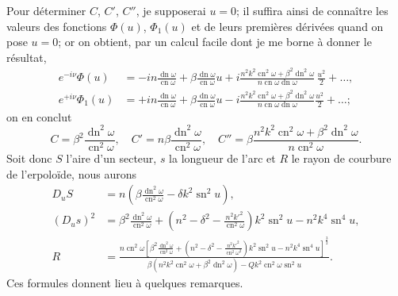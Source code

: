 \documentclass[11pt,leqno,oneside,letterpaper]{book}[2005/09/16]
\DeclareMathOperator{\sn}{sn}
\DeclareMathOperator{\cn}{cn}
\DeclareMathOperator{\dn}{dn}
\begin{document}
Pour d\'eterminer $C$, $C'$, $C''$, je supposerai $u = 0$; il suffira ainsi de conna\^itre
les valeurs des fonctions $\Phi(u)$, $\Phi_1(u)$ et de leurs premi\`eres d\'eriv\'ees
quand on pose $u = 0$; or on obtient, par un calcul facile dont je me
borne \`a donner le r\'esultat,
\begin{align*}
e^{-i\nu}\Phi(u)
&= -in  \frac{\dn\omega}{\cn\omega}
 + \beta\frac{\dn\omega}{\cn\omega}u
 + i\frac{ n^2k^2\cn^2\omega + \beta^2\dn^2\omega }{ n\cn\omega\dn\omega }\,
   \frac{u^2}{2} + \ldots,
\\
e^{+i\nu}\Phi_1(u)
&= +in  \frac{\dn\omega}{\cn\omega}
 + \beta\frac{\dn\omega}{\cn\omega}u
 - i\frac{ n^2k^2\cn^2\omega + \beta^2\dn^2\omega }{ n\cn\omega\dn\omega }
   \frac{u^2}{2} + \ldots;
\end{align*}
on en conclut
\[
C   =  \beta^2\frac{\dn^2\omega}{\cn^2\omega},\quad
C'  = n\beta  \frac{\dn^2\omega}{\cn^2\omega},\quad
C'' =  \beta\frac{n^2k^2\cn^2\omega+\beta^2\dn^2\omega}{n\cn^2\omega}.
\]
Soit donc $S$ l'aire d'un secteur, $s$ la longueur de l'arc et $R$ le rayon de courbure
de l'erpolo\"ide, nous aurons
\begin{align*}
   D_uS
&= n\left( \beta\frac{\dn^2\omega}{\cn^2\omega}
         - \delta k^2\sn^2u \right),
\\
   (D_us)^2
&= \beta^2\frac{\dn^2\omega}{\cn^2\omega}
 + \left(n^2 - \delta^2 - \frac{n^2k'^2}{\cn^2\omega}\right) k^2\sn^2u
 - n^2k^4\sn^4u,
\\
R &= \frac{ n\cn^2\omega
  \left[ \beta^2\frac{\dn^2\omega}{\cn^2\omega}
   + \left(n^2-\delta^2-\frac{n^2k'^2}{\cn^2\omega^2}\right) k^2\sn^2u
   - n^2k^4\sn^4u \right]^{\frac{3}{2}} }
         { \beta(n^2k^2\cn^2\omega+\beta^2\dn^2\omega)
         - Qk^2\cn^2\omega\sn^2u } .
\end{align*}
Ces formules donnent lieu \`a quelques remarques.

\end{document}
